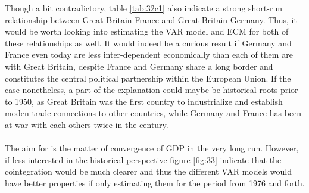 Though a bit contradictory, table \ref{tab:32c1} also indicate a strong short-run relationship between Great Britain-France and Great Britain-Germany. Thus, it would be worth looking into estimating the VAR model and ECM for both of these relationships as well. It would indeed be a curious result if Germany and France even today are less inter-dependent economically than each of them are with Great Britain, despite France and Germany share a long border and constitutes the central political partnership within the European Union. If the case nonetheless, a part of the explanation could maybe be historical roots prior to 1950, as Great Britain was the first country to industrialize and establish moden trade-connections to other countries, while Germany and France has been at war with each others twice in the  century.
\\
\\
The aim for \citet{bernard1995convergence} is the matter of convergence of GDP in the very long run. However, if less interested in the historical perspective figure \ref{fig:33} indicate that the cointegration would be much clearer and thus the different VAR models would have better properties if only estimating them for the period from 1976 and forth.
